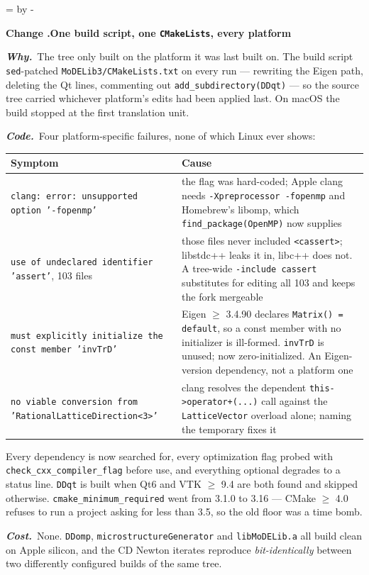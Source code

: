 \documentclass[11pt,a4paper]{article}
\newcommand{\code}[1]{\texttt{\small #1}}
\newcommand{\needlines}[1]{%
  \par\dimen0=\pagegoal \advance\dimen0 by -\pagetotal
  \ifdim\dimen0<#1\baselineskip \newpage \fi}
\newcounter{chg}
\newcommand{\change}[1]{%
  \needlines{4}%
  \refstepcounter{chg}%
  \par\medskip\noindent
  {\bfseries\boldmath Change \thechg.\quad #1}%
  \par\nobreak\smallskip}
\newcommand{\why}[1]{\par\noindent\textbf{\itshape Why.}\ #1\par}
\newcommand{\impact}[1]{\par\noindent\textbf{\itshape Code.}\ #1\par}
\newcommand{\cost}[1]{\par\noindent\textbf{\itshape Cost.}\ #1\par}
\begin{document}
\change{One build script, one \code{CMakeLists}, every platform}
\label{chg:build}
\why{The tree only built on the platform it was last built on. The build
script \code{sed}-patched \code{MoDELib3/CMakeLists.txt} on every run ---
rewriting the Eigen path, deleting the Qt lines, commenting out
\code{add\_subdirectory(DDqt)} --- so the source tree carried whichever
platform's edits had been applied last. On macOS the build stopped at the first
translation unit.}
\impact{Four platform-specific failures, none of which Linux ever shows:

\begin{center}
\small
\begin{tabular}{p{6.2cm}p{8.4cm}}
\toprule
Symptom & Cause \\
\midrule
\code{clang: error: unsupported option '-fopenmp'} & the flag was hard-coded;
  Apple clang needs \code{-Xpreprocessor -fopenmp} and Homebrew's libomp, which
  \code{find\_package(OpenMP)} now supplies \\
\code{use of undeclared identifier 'assert'}, 103 files & those files never
  included \code{<cassert>}; libstdc++ leaks it in, libc++ does not. A
  tree-wide \code{-include cassert} substitutes for editing all 103 and keeps
  the fork mergeable \\
\code{must explicitly initialize the const member 'invTrD'} & Eigen
  $\ge$ 3.4.90 declares \code{Matrix() = default}, so a const member with no
  initializer is ill-formed. \code{invTrD} is unused; now zero-initialized.
  An Eigen-version dependency, not a platform one \\
\code{no viable conversion from 'RationalLatticeDirection<3>'} & clang resolves
  the dependent \code{this->operator+(...)} call against the
  \code{LatticeVector} overload alone; naming the temporary fixes it \\
\bottomrule
\end{tabular}
\end{center}

\noindent
Every dependency is now searched for, every optimization flag probed with
\code{check\_cxx\_compiler\_flag} before use, and everything optional degrades
to a status line. \code{DDqt} is built when Qt6 and VTK $\ge$ 9.4 are both
found and skipped otherwise. \code{cmake\_minimum\_required} went from 3.1.0 to
3.16 --- CMake $\ge$ 4.0 refuses to run a project asking for less than 3.5, so
the old floor was a time bomb.}
\cost{None. \code{DDomp}, \code{microstructureGenerator} and
\code{libMoDELib.a} all build clean on Apple silicon, and the CD Newton
iterates reproduce \emph{bit-identically} between two differently configured
builds of the same tree.}
\end{document}
